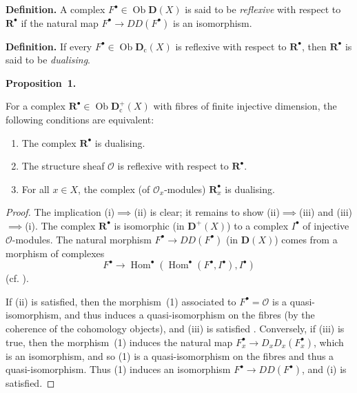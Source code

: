 \documentclass[british]{article}
\providecommand{\tightlist}{%
\setlength{\itemsep}{0pt}\setlength{\parskip}{0pt}}
\newenvironment{itenv}[1]
  {\phantomsection\par\smallskip\noindent\textbf{#1.}\itshape}
  {\par\smallskip}
\newenvironment{rmenv}[1]
  {\phantomsection\par\smallskip\noindent\textbf{#1.}\rmfamily}
  {\par\smallskip}
\newcommand{\oldpage}[1]{\marginpar{\footnotesize$\Big\vert$ \textit{p.~#1}}}
\begin{document}
\begin{rmenv}{Definition}
A complex \(F^\bullet\in\operatorname{Ob}\mathbf{D}(X)\) is said to be
\emph{reflexive} with respect to \(\mathbf{R}^\bullet\) if the natural
map \(F^\bullet\to DD(F^\bullet)\) is an isomorphism.

\end{rmenv}

\begin{rmenv}{Definition}
If every \(F^\bullet\in\operatorname{Ob}\mathbf{D}_\mathrm{c}(X)\) is
reflexive with respect to \(\mathbf{R}^\bullet\), then
\(\mathbf{R}^\bullet\) is said to be \emph{dualising}.

\end{rmenv}

\protect{}\label{proposition-1}
\begin{itenv}{Proposition 1}

For a complex
\(\mathbf{R}^\bullet\in\operatorname{Ob}\mathbf{D}_\mathrm{c}^+(X)\)
with fibres of finite injective dimension, the following conditions are
equivalent: \oldpage{90}

\begin{enumerate}
\def\labelenumi{\roman{enumi}.}
\tightlist
\item
  The complex \(\mathbf{R}^\bullet\) is dualising.
\item
  The structure sheaf \({\mathscr{O}}\) is reflexive with respect to
  \(\mathbf{R}^\bullet\).
\item
  For all \(x\in X\), the complex (of \({\mathscr{O}}_x\)-modules)
  \(\mathbf{R}_x^\bullet\) is dualising.
\end{enumerate}

\end{itenv}

\begin{proof}
The implication (i)\(\implies\)(ii) is clear; it remains to show
(ii)\(\implies\)(iii) and (iii)\(\implies\)(i). The complex
\(\mathbf{R}^\bullet\) is isomorphic (in \(\mathbf{D}^+(X)\)) to a
complex \(I^\bullet\) of injective \({\mathscr{O}}\)-modules. The
natural morphism \(F^\bullet\to DD(F^\bullet)\) (in \(\mathbf{D}(X)\))
comes from a morphism of complexes \[
  F^\bullet \to \operatorname{Hom}^\bullet(\operatorname{Hom}^\bullet(F^\bullet,I^\bullet),I^\bullet)
\tag{1}
\] (cf. \autocite[Chapter~V, (1.2)]{7}).

If (ii) is satisfied, then the morphism~(1) associated to
\(F^\bullet={\mathscr{O}}\) is a quasi-isomorphism, and thus induces a
quasi-isomorphism on the fibres (by the coherence of the cohomology
objects), and (iii) is satisfied \autocite[Chapter~V, (2.1), (iv)]{7}.
Conversely, if (iii) is true, then the morphism~(1) induces the natural
map \(F_x^\bullet\to D_xD_x(F_x^\bullet)\), which is an isomorphism, and
so (1) is a quasi-isomorphism on the fibres and thus a
quasi-isomorphism. Thus (1) induces an isomorphism
\(F^\bullet\to DD(F^\bullet)\), and (i) is satisfied.
\end{proof}
\end{document}

